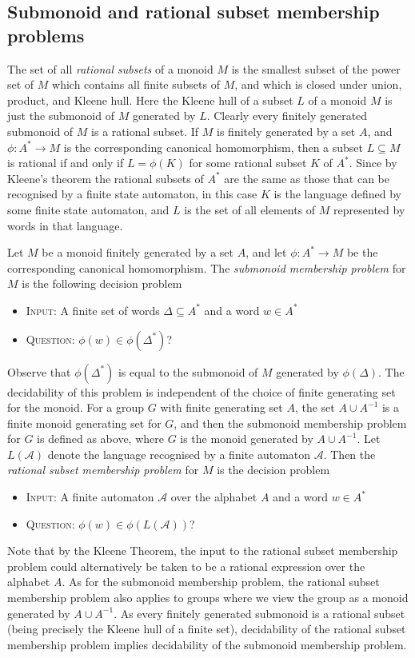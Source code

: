 \documentclass{amsart}
\theoremstyle{plain}
\theoremstyle{definition}
\begin{document}
\subsection*{Submonoid and rational subset membership problems}
The set of all \emph{rational subsets} of a monoid $M$ is the smallest subset of the power set of $M$ which contains 
all finite subsets of $M$, and which is closed under union, product, and Kleene hull.
Here the Kleene hull of a subset $L$ of a monoid $M$ is just the submonoid of $M$ generated by $L$.    
Clearly every finitely generated submonoid of $M$ is a rational subset.  
If $M$ is finitely generated by a set $A$, and $\phi:A^* \rightarrow M$ is the corresponding canonical homomorphism, then a subset $L \subseteq M$ is rational if and only if $L = \phi(K)$ for some rational subset $K$ of $A^*$. 
Since by Kleene's theorem the rational subsets of $A^*$ are the same as those that can be recognised by a finite state automaton, in this case $K$ is the language defined by some finite state automaton, and $L$ is the set of all elements of $M$ represented by words in that language.     


Let $M$ be a monoid finitely generated by a set $A$, and let $\phi:A^* \rightarrow M$ be the corresponding canonical homomorphism. 
The \emph{submonoid membership problem} for $M$ is the following decision problem 

\begin{itemize} 
\item{\textsc{Input}:} A finite set of words $\Delta \subseteq A^*$ and a word $w \in A^*$   
\item{\textsc{Question}:} $\phi(w) \in \phi(\Delta^*)$?   
  \end{itemize}
Observe that $\phi(\Delta^*)$ is equal to the submonoid of $M$ generated by $\phi(\Delta)$.     
The decidability of this problem is independent of the choice of finite generating set for the monoid. For a group $G$ with finite generating set $A$, the set $A \cup A^{-1}$ is a finite monoid generating set for $G$, and then the submonoid membership problem for $G$ is defined as above, where $G$ is the monoid generated by $A \cup A^{-1}$.   
Let $L(\mathcal{A})$ denote the language recognised by a finite automaton $\mathcal{A}$. 
Then the \emph{rational subset membership problem} for $M$ is the decision problem  
\begin{itemize} 
\item{\textsc{Input}:} A finite automaton $\mathcal{A}$ over the alphabet $A$ and a word $w \in A^*$   
\item{\textsc{Question}:} $\phi(w) \in \phi(L(\mathcal{A}))$? 
  \end{itemize}
Note that by the Kleene Theorem, the input to the rational subset membership problem could alternatively be taken to be a rational expression over the alphabet $A$.
As for the submonoid membership problem, the rational subset membership problem also applies to groups where we view the group as a monoid generated by $A \cup A^{-1}$. As every ﬁnitely generated submonoid is a rational subset (being precisely the Kleene hull of a finite set), decidability of the rational subset membership problem implies decidability of the submonoid membership problem.
\end{document}
